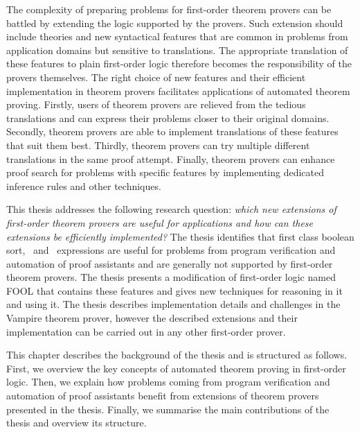 The complexity of preparing problems for first-order theorem provers can be battled by extending the logic supported by the provers. Such extension should include theories and new syntactical features that are common in problems from application domains but sensitive to translations. The appropriate translation of these features to plain first-order logic therefore becomes the responsibility of the provers themselves. The right choice of new features and their efficient implementation in theorem provers facilitates applications of automated theorem proving. Firstly, users of theorem provers are relieved from the tedious translations and can express their problems closer to their original domains. Secondly, theorem provers are able to implement translations of these features that suit them best. Thirdly, theorem provers can try multiple different translations in the same proof attempt. Finally, theorem provers can enhance proof search for problems with specific features by implementing dedicated inference rules and other techniques.

This thesis addresses the following research question: \emph{which new extensions of first-order theorem provers are useful for applications and how can these extensions be efficiently implemented?} The thesis identifies that first class boolean sort, \ITE\ and \LETIN\ expressions are useful for problems from program verification and automation of proof assistants and are generally not supported by first-order theorem provers. The thesis presents a modification of first-order logic named FOOL that contains these features and gives new techniques for reasoning in it and using it. The thesis describes implementation details and challenges in the Vampire theorem prover, however the described extensions and their implementation can be carried out in any other first-order prover.

This chapter describes the background of the thesis and is structured as follows. First, we overview the key concepts of automated theorem proving in first-order logic. Then, we explain how problems coming from program verification and automation of proof assistants benefit from extensions of theorem provers presented in the thesis. Finally, we summarise the main contributions of the thesis and overview its structure.


